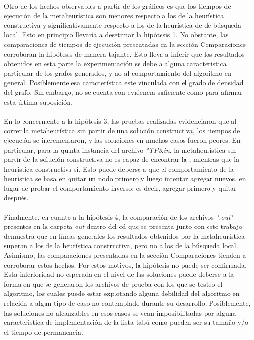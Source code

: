 \paragraph{}
Otro de los hechos observables a partir de los gráficos es que los tiempos de ejecución de la metaheurística son menores respecto a los de la heurística constructiva y significativamente respecto a los de la heurística de de búsqueda local. Esto en principio llevaría a desetimar la hipótesis 1. No obstante, las comparaciones de tiempos de ejecución presentadas en la sección Comparaciones corroboran la hipótesis de manera tajante. Esto lleva a inferir que los resultados obtenidos en esta parte la experimentación se debe a alguna caracteristica particular de los grafos generados, y no al comportamiento del algoritmo en general. Posiblemente esa característica este vinculada con el grado de densidad del grafo. Sin embargo, no se cuenta con evidencia suficiente como para afirmar esta última suposición.

\paragraph{}
En lo concerniente a la hipótesis 3, las pruebas realizadas evidenciaron que al correr la metaheurística sin partir de una solución constructiva, los tiempos de ejecución se incrementaron, y las soluciones en muchos casos fueron peores. En particular, para la quinta instancia del archivo \textit{"TP3.in}, la metaheurística sin partir de la solución constructiva no es capaz de encontrar la \mc, mientras que la heurística constructiva sí. Esto puede deberse a que el comportamiento de la heurística se basa en quitar un nodo primero y luego intentar agregar nuevos, en lugar de probar el comportamiento inverso; es decir, agregar primero y quitar después.

\paragraph{}
Finalmente, en cuanto a la hipótesis 4, la comparación de los archivos \textit{".out"} presentes en la carpeta \textit{out} dentro del cd que se presenta junto con este trabajo demuestra que en líneas generales los resultados obtenidos por la metaheuristica superan a los de la heurística constructiva, pero no a los de la búsqueda local. Asimismo, las comparaciones presentadas en la sección Comparaciones tienden a corroborar estos hechos. Por estos motivos, la hipótesis no puede ser confirmada. \\
Esta inferioridad no esperada en el nivel de las soluciones puede deberse a la forma en que se generaron los archivos de prueba con los que se testeo el algoritmo, los cuales puede estar explotando alguna debilidad del algoritmo en relación a algún tipo de caso no contemplado durante su desarrollo. Posiblemente, las soluciones no alcanzables en esos casos se vean imposibilitadas por alguna caracteristica de implementación de la lista tabú como pueden ser su tamaño y/o el tiempo de permanencia. 

